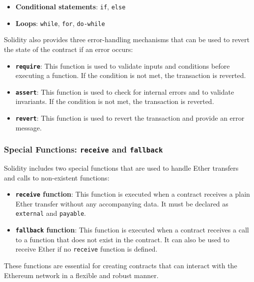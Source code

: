 \begin{itemize}
	\tightlist
	\item
	\textbf{Conditional statements}: \texttt{if}, \texttt{else}
	\item
	\textbf{Loops}: \texttt{while}, \texttt{for}, \texttt{do-while}
\end{itemize}

Solidity also provides three error-handling mechanisms that can be used
to revert the state of the contract if an error occurs:

\begin{itemize}
	\tightlist
	\item
	\textbf{\texttt{require}}: This function is used to validate inputs
	and conditions before executing a function. If the condition is not
	met, the transaction is reverted.
	\item
	\textbf{\texttt{assert}}: This function is used to check for internal
	errors and to validate invariants. If the condition is not met, the
	transaction is reverted.
	\item
	\textbf{\texttt{revert}}: This function is used to revert the
	transaction and provide an error message.
\end{itemize}

\subsubsection{\texorpdfstring{Special Functions: \texttt{receive}
		and
		\texttt{fallback}}{Special Functions: receive and fallback}}\label{special-functions-receive-and-fallback}

Solidity includes two special functions that are used to handle Ether
transfers and calls to non-existent functions:

\begin{itemize}
	\tightlist
	\item
	\textbf{\texttt{receive} function}: This function is executed when a
	contract receives a plain Ether transfer without any accompanying
	data. It must be declared as \texttt{external} and \texttt{payable}.
	\item
	\textbf{\texttt{fallback} function}: This function is executed when a
	contract receives a call to a function that does not exist in the
	contract. It can also be used to receive Ether if no \texttt{receive}
	function is defined.
\end{itemize}

These functions are essential for creating contracts that can interact
with the Ethereum network in a flexible and robust manner.


